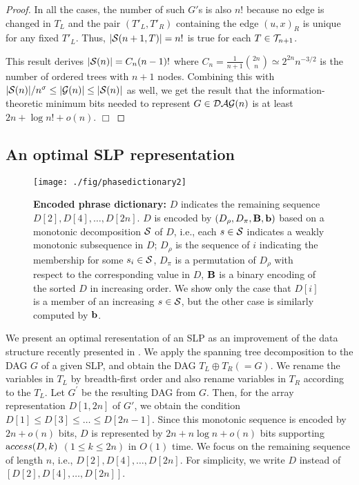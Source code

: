 \documentclass[10pt]{llncs}
\begin{document}
\begin{proof}
In all the cases, the number of such $G'$s is also $n!$ because 
no edge is changed in $T_L$ and the pair $(T'_L,T'_R)$ 
containing the edge $(u,x)_R$ is unique for any fixed $T'_L$.
Thus, $|{\cal S}(n+1,T)|=n!$ is true for each $T\in {\cal T}_{n+1}$.

This result derives $|{\cal S}(n)|=C_n(n-1)!$
where $C_n=\frac{1}{n+1}{2n \choose n}\simeq 2^{2n}n^{-3/2}$
is the number of ordered trees with $n+1$ nodes.
Combining this with 
$|{\cal S}(n)|/n^\sigma \leq 
|{\cal G}(n)| \leq 
|{\cal S}(n)|$ as well,
we get the result that the information-theoretic minimum bits needed to represent
$G\in {\cal DAG}(n)$ is at least $2n + \log n! + o(n)$.
\hspace{\fill}$\Box$
\end{proof}

\subsection{An optimal SLP representation}
\begin{figure}[t]
\begin{center}
\texttt{[image: ./fig/phasedictionary2]}
\end{center}
\vspace{-.5cm}
\caption{
{\bf Encoded phrase dictionary:}
$D$ indicates the remaining sequence $D[2],D[4],\ldots, D[2n]$.
$D$ is encoded by $(D_\rho,D_\pi,{\bf B},{\bf b})$
based on a monotonic decomposition ${\cal S}$ of $D$, i.e.,
each $s\in{\cal S}$ indicates a weakly monotonic subsequence in $D$;
$D_\rho$ is the sequence of $i$ indicating the membership for some $s_i\in{\cal S}$,
$D_\pi$ is a permutation of $D_\rho$ with respect to 
the corresponding value in $D$,
${\bf B}$ is a binary encoding of the sorted $D$ in increasing order.
We show only the case that $D[i]$ is a member of an increasing $s\in{\cal S}$, but 
the other case is similarly computed by ${\bf b}$.
}
\label{dic_enc}
\end{figure}

We present an optimal reresentation of an SLP as an improvement of the data structure recently presented in \cite{Takabatake2012}.
We apply the spanning tree decomposition to the DAG $G$ of a given SLP, and obtain the DAG $T_L \oplus T_R(=G)$.
We rename the variables in $T_L$ by breadth-first order 
and also rename variables in $T_R$ according to the $T_L$.
Let $G^\prime$ be the resulting DAG from $G$. 
Then, for the array representation $D[1,2n]$ of $G'$, we obtain
the condition $D[1]\leq D[3]\leq \ldots \leq D[2n-1]$.
Since this monotonic sequence is encoded by $2n + o(n)$ bits,
$D$ is represented by $2n + n\log n + o(n)$ bits supporting
${\mbox access}(D,k)$ $(1\leq k\leq 2n)$ in $O(1)$ time.
We focus on the remaining sequence of length $n$, i.e., $D[2],D[4],\ldots,D[2n]$.
For simplicity, we write $D$ instead of $[D[2],D[4],\ldots,D[2n]]$. 
\end{document}
